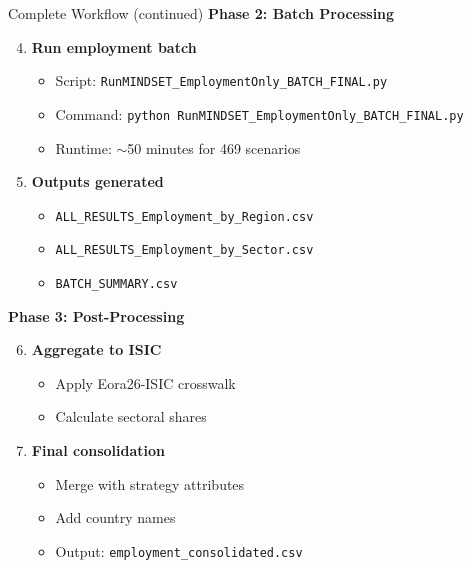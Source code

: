 \documentclass[10pt]{beamer}
\begin{document}
\begin{frame}{Complete Workflow (continued)}
\textbf{Phase 2: Batch Processing}

\vspace{0.2cm}

\begin{enumerate}
    \setcounter{enumi}{3}

    \item \textbf{Run employment batch}
    \begin{itemize}
        \item Script: \texttt{RunMINDSET\_EmploymentOnly\_BATCH\_FINAL.py}
        \item Command: \texttt{python RunMINDSET\_EmploymentOnly\_BATCH\_FINAL.py}
        \item Runtime: $\sim$50 minutes for 469 scenarios
    \end{itemize}

    \vspace{0.1cm}

    \item \textbf{Outputs generated}
    \begin{itemize}
        \item \texttt{ALL\_RESULTS\_Employment\_by\_Region.csv}
        \item \texttt{ALL\_RESULTS\_Employment\_by\_Sector.csv}
        \item \texttt{BATCH\_SUMMARY.csv}
    \end{itemize}
\end{enumerate}

\vspace{0.3cm}

\textbf{Phase 3: Post-Processing}

\vspace{0.2cm}

\begin{enumerate}
    \setcounter{enumi}{5}

    \item \textbf{Aggregate to ISIC}
    \begin{itemize}
        \item Apply Eora26-ISIC crosswalk
        \item Calculate sectoral shares
    \end{itemize}

    \item \textbf{Final consolidation}
    \begin{itemize}
        \item Merge with strategy attributes
        \item Add country names
        \item Output: \texttt{employment\_consolidated.csv}
    \end{itemize}
\end{enumerate}

\end{frame}
\end{document}
